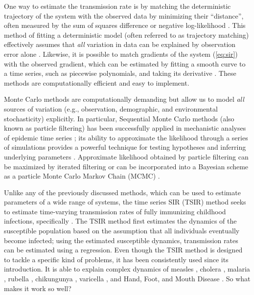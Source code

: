 \documentclass{article}
\newcommand{\eref}[1]{(\ref{eq:#1})}
\begin{document}
One way to estimate the transmission rate is by matching the deterministic trajectory of the system with the observed data by minimizing their ``distance'', often measured by the sum of squares difference or negative log-likelihood \citep{riley2003transmission, chowell2004basic}.
This method of fitting a deterministic model (often referred to as trajectory matching) effectively assumes that \emph{all} variation in data can be explained by observation error alone \citep{bolker2008ecological}.
Likewise, it is possible to match gradients of the system \eref{sir} with the observed gradient, which can be estimated by fitting a smooth curve to a time series, such as piecewise polynomials, and taking its derivative \citep{ellner2002fitting}.
These methods are computationally efficient and easy to implement.

Monte Carlo methods are computationally demanding but allow us to model \emph{all} sources of variation (e.g., observation, demographic, and environmental stochasticity) explicitly.
In particular, Sequential Monte Carlo methods (also known as particle filtering) has been successfully applied in mechanistic analyses of epidemic time series \citep{he2009plug, he2011mechanistic, didelot2017model}; its ability to approximate the likelihood through a series of simulations provides a powerful technique for testing hypotheses and inferring underlying parameters \citep{ionides2006inference, breto2009time, king2015statistical}.
Approximate likelihood obtained by particle filtering can be maximized by iterated filtering \citep{ionides2011iterated, ionides2015inference} or can be incorporated into a Bayesian scheme as a particle Monte Carlo Markov Chain (MCMC) \citep{andrieu2010particle}.

Unlike any of the previously discussed methods, which can be used to estimate parameters of a wide range of systems, the time series SIR (TSIR) method seeks to estimate time-varying transmission rates of fully immunizing childhood infections, specifically \citep{finkenstadt2000time}.
The TSIR method first estimates the dynamics of the susceptible population based on the assumption that all individuals eventually become infected;
using the estimated susceptible dynamics, transmission rates can be estimated using a regression. 
Even though the TSIR method is designed to tackle a specific kind of problems, it has been consistently used since its introduction.
It is able to explain complex dynamics of measles \citep{finkenstadt2000time, bjornstad2002dynamics, grenfell2002dynamics, finkenstadt2002stochastic, metcalf2009seasonality, mantilla2009decreasing, ferrari2010rural, dalziel2016persistent, mahmud2017drivers}, 
cholera \citep{koelle2004disentangling, pascual2008predicting}, 
malaria \citep{pascual2007shifting}, 
rubella \citep{metcalf2010rubella,metcalf2011epidemiology, metcalf2013implications}, 
chikungunya \citep{perkins2015estimating}, 
varicella \citep{jackson2014effects, baker2018dynamic}, 
and Hand, Foot, and Mouth Disease \citep{takahashi2016hand, van2016hand, du2017estimating, takahashi2018epidemic}.
So what makes it work so well?
\end{document}
